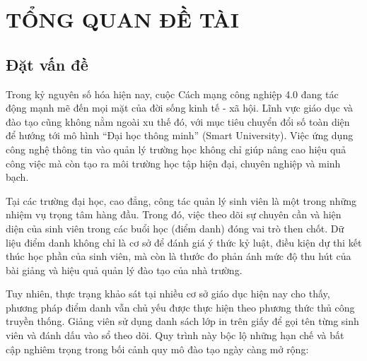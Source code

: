 \documentclass[12pt,a4paper]{report}
\begin{document}
\cleardoublepage
{} %

\tableofcontents 
\newpage

\renewcommand{\listfigurename}{DANH SÁCH HÌNH ẢNH} %
\listoffigures 
\newpage

\renewcommand{\listtablename}{DANH SÁCH BẢNG} %
\listoftables 
\newpage

\cleardoublepage
{} %
\setcounter{page}{1}

\chapter{TỔNG QUAN ĐỀ TÀI}

\section{Đặt vấn đề}

Trong kỷ nguyên số hóa hiện nay, cuộc Cách mạng công nghiệp 4.0 đang tác động mạnh mẽ đến mọi mặt của đời sống kinh tế - xã hội. Lĩnh vực giáo dục và đào tạo cũng không nằm ngoài xu thế đó, với mục tiêu chuyển đổi số toàn diện để hướng tới mô hình ``Đại học thông minh'' (Smart University). Việc ứng dụng công nghệ thông tin vào quản lý trường học không chỉ giúp nâng cao hiệu quả công việc mà còn tạo ra môi trường học tập hiện đại, chuyên nghiệp và minh bạch.

Tại các trường đại học, cao đẳng, công tác quản lý sinh viên là một trong những nhiệm vụ trọng tâm hàng đầu. Trong đó, việc theo dõi sự chuyên cần và hiện diện của sinh viên trong các buổi học (điểm danh) đóng vai trò then chốt. Dữ liệu điểm danh không chỉ là cơ sở để đánh giá ý thức kỷ luật, điều kiện dự thi kết thúc học phần của sinh viên, mà còn là thước đo phản ánh mức độ thu hút của bài giảng và hiệu quả quản lý đào tạo của nhà trường.

Tuy nhiên, thực trạng khảo sát tại nhiều cơ sở giáo dục hiện nay cho thấy, phương pháp điểm danh vẫn chủ yếu được thực hiện theo phương thức thủ công truyền thống. Giảng viên sử dụng danh sách lớp in trên giấy để gọi tên từng sinh viên và đánh dấu vào sổ theo dõi. Quy trình này bộc lộ những hạn chế và bất cập nghiêm trọng trong bối cảnh quy mô đào tạo ngày càng mở rộng:
\end{document}
